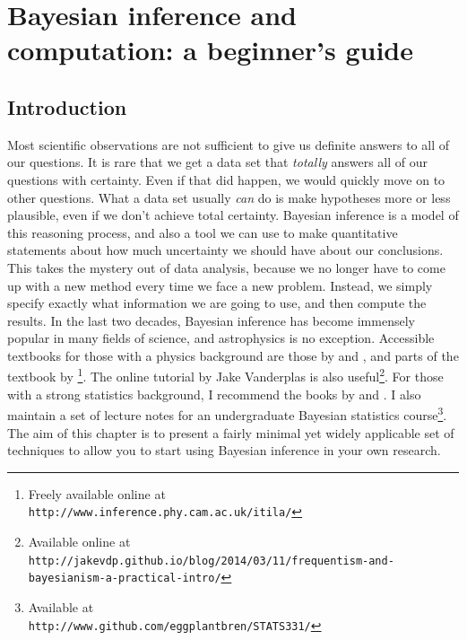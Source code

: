 \newcommand{\btheta}{\boldsymbol{\theta}}
\newcommand{\data}{\boldsymbol{D}}
\newcommand{\documentname}{chapter}

\author[Brendon J. Brewer]{Brendon J. Brewer\\
Department of Statistics, The University of Auckland}

\chapter{Bayesian inference and computation: a beginner's guide}

\section{Introduction}
Most scientific observations are not sufficient to give us definite answers
to all of our questions. It is rare that we get a data set that {\it totally}
answers all of our questions with certainty. Even if that did happen, we would
quickly move on to other questions.
What a data set usually {\it can} do is make hypotheses more or less plausible,
even if we don't achieve total certainty.
Bayesian inference is a model of this
reasoning process, and also a tool we can use
to make quantitative statements about how much
uncertainty we should have about our conclusions. This takes the mystery out
of data analysis, because we no longer have to come up with a new method
every time we face a new problem. Instead, we simply specify exactly what
information we are going to use, and then compute the results.
In the last two decades, Bayesian inference has become immensely popular in
many fields of science, and astrophysics is no exception. Accessible textbooks
for those with a physics background are those by \citet{gregory} and
\citet{sivia}, and parts of the textbook by \citet{mackay}\footnote{Freely
available online at\\
{\tt http://www.inference.phy.cam.ac.uk/itila/}}.
The online tutorial
by Jake Vanderplas is also useful\footnote{Available online at\\
{\tt http://jakevdp.github.io/blog/2014/03/11/frequentism-and-bayesianism-a-practical-intro/}}. For those with a strong statistics background,
I recommend the books by \citet{ohagan} and \citep{gelman}. I also maintain
a set of lecture notes for an undergraduate Bayesian statistics
course\footnote{Available at\\
{\tt http://www.github.com/eggplantbren/STATS331/}}.
The aim of this chapter is to present a fairly minimal yet widely applicable set of techniques to
allow you to start using Bayesian inference in your own research.

